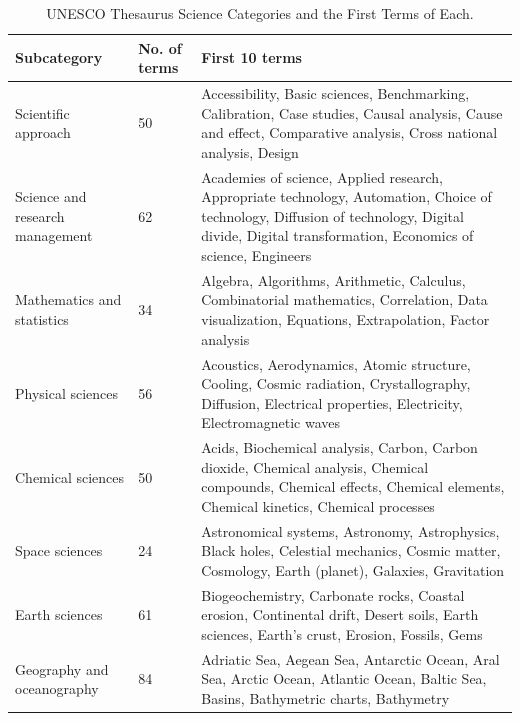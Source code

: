\documentclass[pdflatex,sn-mathphys-num,iicol]{sn-jnl}
\begin{document}
\begin{table}[t]
	\centering
	\footnotesize
	\caption{UNESCO Thesaurus Science Categories and the First Terms of Each.}
	\label{tab:categorias_ciencia}
	
	\begin{tabular}{@{}p{3.5cm}p{2cm}p{8.5cm}@{}}
		\toprule
		\textbf{Subcategory} & \textbf{No. of terms} & \textbf{First 10 terms} \\
		\midrule
		
		Scientific approach & 50 & Accessibility, Basic sciences, Benchmarking, Calibration, Case studies, Causal analysis, Cause and effect, Comparative analysis, Cross national analysis, Design \\
		
		Science and research management & 62 & Academies of science, Applied research, Appropriate technology, Automation, Choice of technology, Diffusion of technology, Digital divide, Digital transformation, Economics of science, Engineers \\
		
		Mathematics and statistics & 34 & Algebra, Algorithms, Arithmetic, Calculus, Combinatorial mathematics, Correlation, Data visualization, Equations, Extrapolation, Factor analysis \\
		
		Physical sciences & 56 & Acoustics, Aerodynamics, Atomic structure, Cooling, Cosmic radiation, Crystallography, Diffusion, Electrical properties, Electricity, Electromagnetic waves \\
		
		Chemical sciences & 50 & Acids, Biochemical analysis, Carbon, Carbon dioxide, Chemical analysis, Chemical compounds, Chemical effects, Chemical elements, Chemical kinetics, Chemical processes \\
		
		Space sciences & 24 & Astronomical systems, Astronomy, Astrophysics, Black holes, Celestial mechanics, Cosmic matter, Cosmology, Earth (planet), Galaxies, Gravitation \\
		
		Earth sciences & 61 & Biogeochemistry, Carbonate rocks, Coastal erosion, Continental drift, Desert soils, Earth sciences, Earth's crust, Erosion, Fossils, Gems \\
		
		Geography and oceanography & 84 & Adriatic Sea, Aegean Sea, Antarctic Ocean, Aral Sea, Arctic Ocean, Atlantic Ocean, Baltic Sea, Basins, Bathymetric charts, Bathymetry \\
		

\end{tabular}
\end{table}
\end{document}
